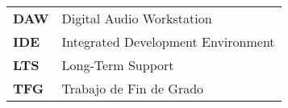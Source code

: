 
\renewcommand{\arraystretch}{1.5}



\begin{longtable}{l p{13.7cm}}
	
\textbf{DAW} & Digital Audio Workstation \\
\textbf{IDE} & Integrated Development Environment \\
\textbf{LTS} & Long-Term Support \\
\textbf{TFG} & Trabajo de Fin de Grado \\

\end{longtable}
